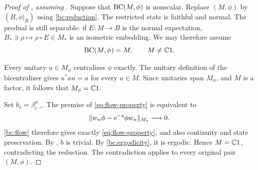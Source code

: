 \begin{proof}[Proof of , assuming ]
Suppose that $\operatorname{BC}(M,\phi)$ is nonscalar. Replace $(M,\phi)$ by
$(B,\phi|_B)$ using \ref{bc:reduction}.
The restricted state is faithful and normal.
The predual is still separable: if $E:M\to B$ is the normal expectation,
$B_*\ni\rho\mapsto\rho\circ E\in M_*$ is an isometric embedding.
We may therefore assume
\[
  \operatorname{BC}(M,\phi)=M,\qquad M\ne\mathbb C1.
\]

Every unitary $u\in M_\phi$ centralizes $\phi$ exactly. The unitary
definition of the bicentralizer gives $u^*au=a$ for every $a\in M$.
Since unitaries span $M_\phi$, and $M$ is a factor, it follows that
$M_\phi=\mathbb C1$.

Set $b_s=\beta^\phi_{e^{-s}}$.
The premise of \eqref{eq:flow-property} is equivalent to
\[
  \lVert w_n\phi-e^{-s}\phi w_n\rVert_{M_*}\longrightarrow0.
\]
\ref{bc:flow} therefore gives exactly
\eqref{eq:flow-property}, and also continuity and state preservation.
By , $b$ is trivial. By
\ref{bc:ergodicity}, it is ergodic. Hence $M=\mathbb C1$,
contradicting the reduction.
The contradiction applies to every original pair $(M,\phi)$.
\end{proof}
